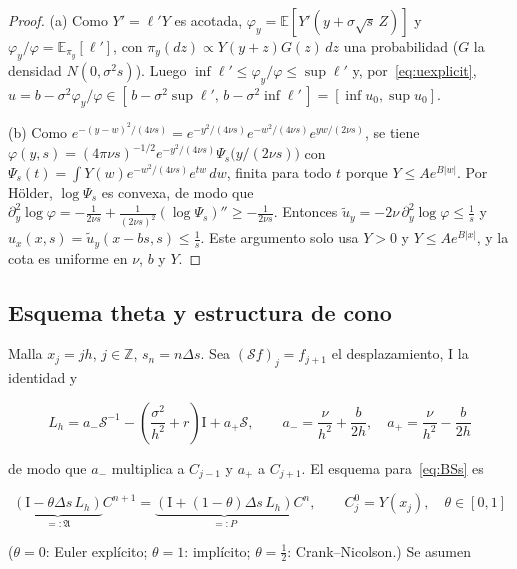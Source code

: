 \documentclass[11pt,letterpaper]{article}
\theoremstyle{plain}
\theoremstyle{definition}
\theoremstyle{remark}
\numberwithin{equation}{section}
\newcommand{\Z}{\mathbb{Z}}
\newcommand{\E}{\mathbb{E}}
\newcommand{\Sh}{\mathcal{S}}
\newcommand{\Id}{\mathrm{I}}
\begin{document}
	\begin{proof}
		(a) Como \(Y'=\ell'Y\) es acotada, \(\varphi_y=\E[Y'(y+\sigma\sqrt s\,Z)]\) y \(\varphi_y/\varphi=\E_{\pi_y}[\ell']\), con \(\pi_y(dz)\propto Y(y+z)G(z)\,dz\) una probabilidad (\(G\) la densidad \(N(0,\sigma^2s)\)). Luego \(\inf\ell'\le\varphi_y/\varphi\le\sup\ell'\) y, por~\eqref{eq:uexplicit}, \(u=b-\sigma^2\varphi_y/\varphi\in[\,b-\sigma^2\sup\ell',\,b-\sigma^2\inf\ell'\,]=[\inf u_0,\sup u_0]\).
		
		(b) Como \(e^{-(y-w)^2/(4\nu s)}=e^{-y^2/(4\nu s)}e^{-w^2/(4\nu s)}e^{yw/(2\nu s)}\), se tiene \(\varphi(y,s)=(4\pi\nu s)^{-1/2}e^{-y^2/(4\nu s)}\Psi_s\bigl(y/(2\nu s)\bigr)\) con \(\Psi_s(t)=\int Y(w)e^{-w^2/(4\nu s)}e^{tw}\,dw\), finita para todo \(t\) porque \(Y\le Ae^{B|w|}\). Por Hölder, \(\log\Psi_s\) es convexa, de modo que \(\partial_y^2\log\varphi=-\frac1{2\nu s}+\frac1{(2\nu s)^2}(\log\Psi_s)''\ge-\frac1{2\nu s}\). Entonces \(\tilde u_y=-2\nu\,\partial_y^2\log\varphi\le\frac1s\) y \(u_x(x,s)=\tilde u_y(x-bs,s)\le\frac1s\). Este argumento solo usa \(Y>0\) y \(Y\le Ae^{B|x|}\), y la cota es uniforme en \(\nu\), \(b\) y \(Y\).
	\end{proof}
	
	\subsection{Esquema theta y estructura de cono}\label{subsec:theta}
	
	Malla \(x_j=jh\), \(j\in\Z\), \(s_n=n\Delta s\). Sea \((\Sh f)_j=f_{j+1}\) el desplazamiento, \(\Id\) la identidad y
	
	\begin{equation}\label{eq:Lh}
		L_h=a_-\Sh^{-1}-\left(\frac{\sigma^2}{h^2}+r\right)\Id+a_+\Sh,\qquad a_-=\frac{\nu}{h^2}+\frac{b}{2h},\quad a_+=\frac{\nu}{h^2}-\frac{b}{2h}
	\end{equation}
	
	de modo que \(a_-\) multiplica a \(C_{j-1}\) y \(a_+\) a \(C_{j+1}\). El esquema para~\eqref{eq:BSs} es
	
	\begin{equation}\label{eq:theta}
		\underbrace{(\Id-\theta\Delta s\,L_h)}_{=:\mathfrak A}C^{n+1}=\underbrace{(\Id+(1-\theta)\Delta s\,L_h)}_{=:P}C^n,\qquad C^0_j=Y(x_j),\quad \theta\in[0,1]
	\end{equation}
	
	(\(\theta=0\): Euler explícito; \(\theta=1\): implícito; \(\theta=\frac12\): Crank--Nicolson.) Se asumen
	
\end{document}
